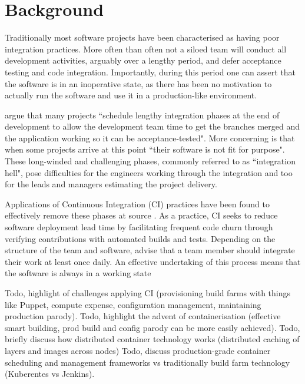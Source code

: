 \documentclass{report}
\begin{document}
\section{Background}
Traditionally most software projects have been characterised as having
poor integration practices. More often than often not a siloed team 
will conduct all development activities, arguably over a lengthy period,
and defer acceptance testing and code integration. Importantly, during
this period one can assert that the software is in an inoperative state, as there has
been no motivation to actually run the software and use it in a
production-like environment.
\par 
\citet{Jez} argue that many projects ``schedule lengthy integration phases at
the end of development to allow the development team time to get the branches
merged and the application working so it can be acceptance-tested". More concerning
is that when some projects arrive at this point ``their software is not fit for
purpose". These long-winded and challenging phases, commonly referred
to as ``integration hell", pose difficulties for the engineers working through the integration
and too for the leads and managers estimating the project delivery.
\par
Applications of Continuous Integration (CI) practices have been found to effectively 
remove these phases at source \citep{Vas, Fitz, Jez, Duvall}. As a practice, CI seeks to reduce software deployment lead time by
facilitating frequent code churn through verifying contributions with automated 
builds and tests. Depending on the structure of the team and software, \citet{Jez} 
advise that a team member should integrate their work at least once daily. An effective 
undertaking of this process means that the software is always in a working state
\par
Todo, highlight of challenges applying CI (provisioning build farms with things like Puppet, compute expense, configuration management, maintaining production parody). 
Todo, highlight the advent of containerisation (effective smart building, prod build and config parody can be more easily achieved).
Todo, briefly discuss how distributed container technology works (distributed caching of layers and images across nodes)
Todo, discuss production-grade container scheduling and management frameworks vs traditionally build farm technology (Kuberentes vs Jenkins).
\end{document}
